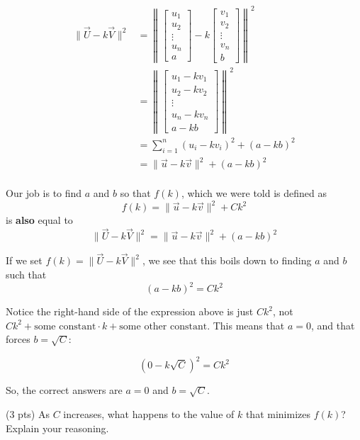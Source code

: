 \documentclass[11pt]{article}
\begin{document}
\begin{prob}[(13 pts)]
\begin{subprob}
\begin{solution}
\begin{align*}
\lVert \vec U - k \vec V \rVert^2 &= \left\lVert \begin{bmatrix} u_1 \\ u_2 \\ \vdots \\ u_n \\ a\end{bmatrix} - k \begin{bmatrix} v_1 \\ v_2 \\ \vdots \\ v_n \\ b\end{bmatrix} \right\rVert^2 \\
&= \left\lVert \begin{bmatrix} u_1 - kv_1 \\ u_2 - kv_2 \\ \vdots \\ u_n - kv_n \\ a - kb\end{bmatrix} \right\rVert^2 \\
&= \sum_{i=1}^n (u_i - kv_i)^2 + (a - kb)^2 \\
&= \lVert \vec u - k \vec v \rVert^2 + (a - kb)^2 \\
\end{align*}

Our job is to find $a$ and $b$ so that $f(k)$, which we were told is defined as $$f(k) =\lVert \vec u - k \vec v \rVert^2 + C k^2$$ is \textbf{also} equal to $$\lVert \vec U - k \vec V \rVert^2 = \lVert \vec u - k \vec v \rVert^2 + (a - kb)^2$$

If we set $f(k) = \lVert \vec U - k \vec V \rVert^2$, we see that this boils down to finding $a$ and $b$ such that $$(a - kb)^2 = C k^2$$

Notice the right-hand side of the expression above is just $Ck^2$, not $Ck^2 + \text{some constant} \cdot k + \text{some other constant}$. This means that $a = 0$, and that forces $b = \sqrt{C}$:

$$(0 - k\sqrt{C})^2 = Ck^2$$

So, the correct answers are $\boxed{a=0}$ and $\boxed{b=\sqrt{C}}$.
\end{solution}
\end{subprob}

\begin{subprob}(3 pts) As $C$ increases, what happens to the value of $k$ that minimizes $f(k)$? Explain your reasoning. \\


\end{subprob}
\end{prob}
\end{document}
